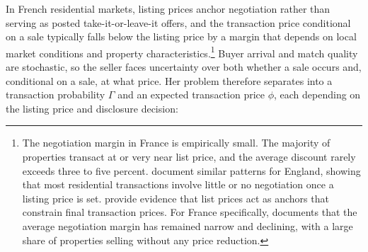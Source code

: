 In French residential markets, listing prices anchor negotiation rather than serving as posted take-it-or-leave-it offers, and the transaction price conditional on a sale typically falls below the listing price by a margin that depends on local market conditions and property characteristics.\footnote{The negotiation margin in France is empirically small. The majority of properties transact at or very near list price, and the average discount rarely exceeds three to five percent. \citet{merlo_bargaining_2004} document similar patterns for England, showing that most residential transactions involve little or no negotiation once a listing price is set. \citet{genesove_loss_2001} provide evidence that list prices act as anchors that constrain final transaction prices. For France specifically, \citet{friggit_marche_2013} documents that the average negotiation margin has remained narrow and declining, with a large share of properties selling without any price reduction.} Buyer arrival and match quality are stochastic, so the seller faces uncertainty over both whether a sale occurs and, conditional on a sale, at what price. Her problem therefore separates into a transaction probability $\Gamma$ and an expected transaction price $\phi$, each depending on the listing price and disclosure decision:
